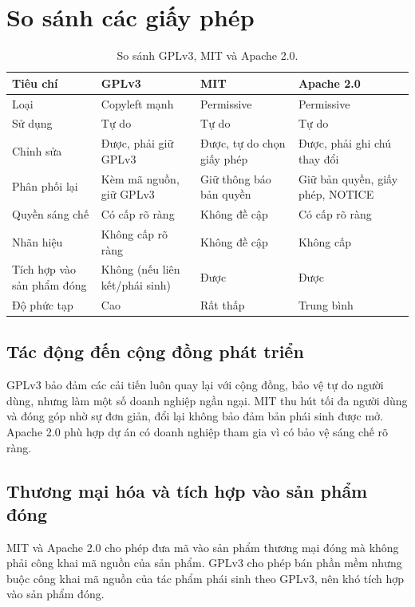\documentclass[12pt,a4paper]{article}
\begin{document}
\section{So sánh các giấy phép}
\begin{table}[h]
\centering
\small
\begin{tabularx}{\textwidth}{>{\raggedright\arraybackslash}p{3.2cm}XXX}
\toprule
\textbf{Tiêu chí} & \textbf{GPLv3} & \textbf{MIT} & \textbf{Apache 2.0} \\
\midrule
Loại & Copyleft mạnh & Permissive & Permissive \\
Sử dụng & Tự do & Tự do & Tự do \\
Chỉnh sửa & Được, phải giữ GPLv3 & Được, tự do chọn giấy phép & Được, phải ghi chú thay đổi \\
Phân phối lại & Kèm mã nguồn, giữ GPLv3 & Giữ thông báo bản quyền & Giữ bản quyền, giấy phép, NOTICE \\
Quyền sáng chế & Có cấp rõ ràng & Không đề cập & Có cấp rõ ràng \\
Nhãn hiệu & Không cấp rõ ràng & Không đề cập & Không cấp \\
Tích hợp vào sản phẩm đóng & Không (nếu liên kết/phái sinh) & Được & Được \\
Độ phức tạp & Cao & Rất thấp & Trung bình \\
\bottomrule
\end{tabularx}
\caption{So sánh GPLv3, MIT và Apache 2.0.}
\end{table}

\subsection{Tác động đến cộng đồng phát triển}
GPLv3 bảo đảm các cải tiến luôn quay lại với cộng đồng, bảo vệ tự do người dùng, nhưng làm một số doanh nghiệp ngần ngại. MIT thu hút tối đa người dùng và đóng góp nhờ sự đơn giản, đổi lại không bảo đảm bản phái sinh được mở. Apache 2.0 phù hợp dự án có doanh nghiệp tham gia vì có bảo vệ sáng chế rõ ràng.

\subsection{Thương mại hóa và tích hợp vào sản phẩm đóng}
MIT và Apache 2.0 cho phép đưa mã vào sản phẩm thương mại đóng mà không phải công khai mã nguồn của sản phẩm. GPLv3 cho phép bán phần mềm nhưng buộc công khai mã nguồn của tác phẩm phái sinh theo GPLv3, nên khó tích hợp vào sản phẩm đóng.
\end{document}
